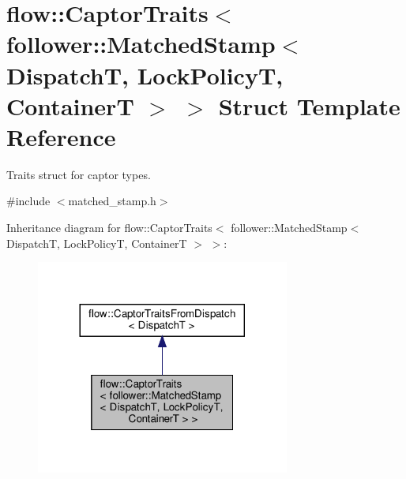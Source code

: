 \hypertarget{structflow_1_1_captor_traits_3_01follower_1_1_matched_stamp_3_01_dispatch_t_00_01_lock_policy_t_00_01_container_t_01_4_01_4}{}\section{flow\+:\+:Captor\+Traits$<$ follower\+:\+:Matched\+Stamp$<$ DispatchT, Lock\+PolicyT, ContainerT $>$ $>$ Struct Template Reference}
\label{structflow_1_1_captor_traits_3_01follower_1_1_matched_stamp_3_01_dispatch_t_00_01_lock_policy_t_00_01_container_t_01_4_01_4}


Traits struct for captor types.  




{\ttfamily \#include $<$matched\+\_\+stamp.\+h$>$}



Inheritance diagram for flow\+:\+:Captor\+Traits$<$ follower\+:\+:Matched\+Stamp$<$ DispatchT, Lock\+PolicyT, ContainerT $>$ $>$\+:
\nopagebreak
\begin{figure}[H]
\begin{center}
\leavevmode
\includegraphics[width=236pt]{structflow_1_1_captor_traits_3_01follower_1_1_matched_stamp_3_01_dispatch_t_00_01_lock_policy_t_d7d58332bca5ee37ca67e4542e1a821b}
\end{center}
\end{figure}


